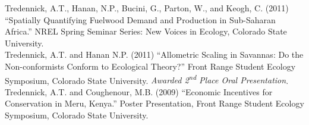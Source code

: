 \documentclass[margin,line]{resume}
\begin{document}
\begin{resume}
    Tredennick, A.T., Hanan, N.P., Bucini, G., Parton, W., and Keogh, C. (2011) ``Spatially Quantifying Fuelwood Demand and Production in Sub-Saharan Africa.'' NREL Spring Seminar Series: New Voices in Ecology, Colorado State University.\vspace{-6mm}\\%
    
    Tredennick, A.T. and Hanan N.P. (2011) ``Allometric Scaling in Savannas: Do the Non-conformists Conform to Ecological Theory?'' Front Range Student Ecology Symposium, Colorado State University. \textsl{Awarded 2\textsuperscript{nd} Place Oral Presentation}.\vspace{-6mm}\\%
  
  Tredennick, A.T. and Coughenour, M.B. (2009) ``Economic Incentives for Conservation in Meru, Kenya.'' Poster Presentation, Front Range Student Ecology Symposium, Colorado State University.

\end{resume}
\end{document}
